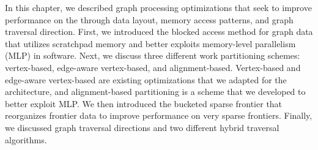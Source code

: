 In this chapter, we described graph processing optimizations that seek to improve performance on the \hbmc through data layout, memory access patterns, and graph traversal direction.
First, we introduced the blocked access method for graph data that utilizes scratchpad memory and better exploits memory-level parallelism (MLP) in software.
Next, we discuss three different work partitioning schemes: vertex-based, edge-aware vertex-based, and alignment-based.
Vertex-based and edge-aware vertex-based are existing optimizations that we adapted for the \hb architecture, and alignment-based partitioning is a scheme that we developed to better exploit MLP.
We then introduced the bucketed sparse frontier that reorganizes frontier data to improve performance on very sparse frontiers.
Finally, we discussed graph traversal directions and two different hybrid traversal algorithms.
